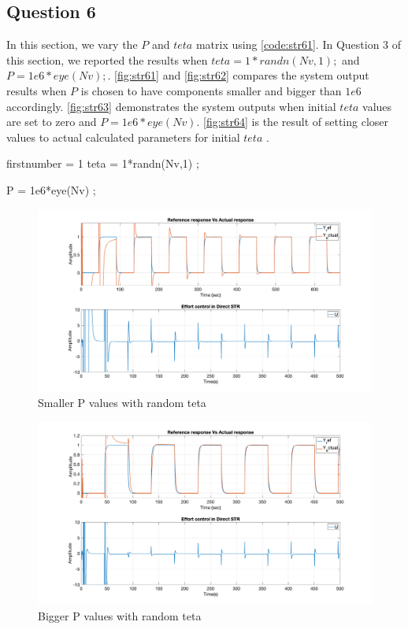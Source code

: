 \FloatBarrier
\subsection{Question 6}
In this section, we vary the $P$ and $teta$ matrix using \autoref{code:str61}. In Question 3 of this section, we reported the results when $teta = 1*randn(Nv,1) ;$ and $P = 1e6*eye(Nv) ;$. \autoref{fig:str61} and \autoref{fig:str62} compares the system output results when $P$ is chosen to have components smaller and bigger than $1e6$ accordingly. \autoref{fig:str63} demonstrates the system outputs when initial $teta$ values are set to zero and $P = 1e6*eye(Nv)$. \autoref{fig:str64}  is the result of setting closer values to actual calculated parameters for initial $teta$ .

\begin{code}
	\begin{matlabcode}{firstnumber = 1}
teta = 1*randn(Nv,1) ;

P = 1e6*eye(Nv) ;
	\end{matlabcode}
	\label{code:str61}
\end{code}

\begin{figure}
	\centering
	\includegraphics[width=\textwidth]{images/str61.png}
	\caption{Smaller P values with random teta}
	\label{fig:str61}
\end{figure}

\begin{figure}
	\centering
	\includegraphics[width=\textwidth]{images/str62.png}
	\caption{Bigger P values with random teta}
	\label{fig:str62}
\end{figure}

